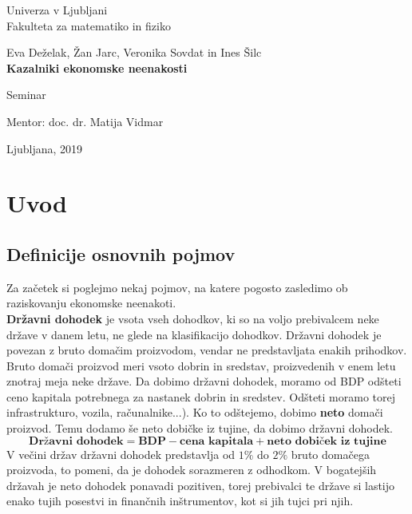 \documentclass[a4paper,12 pt]{article}
\begin{document}
\begin{titlepage}
\begin{center}

\large
Univerza v Ljubljani\\
\normalsize
Fakulteta za matematiko in fiziko\\

\vspace{3 cm} 

\large
Eva Deželak, Žan Jarc, Veronika Sovdat in Ines Šilc\\

\vspace{0.5cm}
\LARGE
\textbf{Kazalniki ekonomske neenakosti}

\vspace{0.5 cm}
\normalsize
Seminar

\vspace{1.5cm}
\normalsize
Mentor: doc. dr. Matija Vidmar

\vspace{3cm}


\vfill

\large Ljubljana, 2019

\end{center}
\end{titlepage}

\newpage

\tableofcontents
\vspace{20mm}

\newpage

\section[Uvod]{Uvod}

\subsection[Definicije osnovnih pojmov]{Definicije osnovnih pojmov}
Za začetek si poglejmo nekaj pojmov, na katere pogosto zasledimo ob raziskovanju ekonomske neenakoti.
\\ 

\textbf{Državni dohodek} je vsota vseh dohodkov, ki so na voljo prebivalcem neke države v danem letu, ne glede na klasifikacijo dohodkov. Državni dohodek je povezan z bruto domačim proizvodom, vendar ne predstavljata enakih prihodkov. Bruto domači proizvod meri vsoto dobrin in sredstav, proizvedenih v enem letu znotraj meja neke države. Da dobimo državni dohodek, moramo od BDP odšteti ceno kapitala potrebnega za nastanek dobrin in sredstev. Odšteti moramo torej infrastrukturo, vozila, računalnike...). Ko to odštejemo, dobimo \textbf{neto} domači proizvod. Temu dodamo še neto dobičke iz tujine, da dobimo državni dohodek.
$$
\textbf{Državni dohodek} = \textbf{BDP} - \textbf{cena kapitala} + \textbf{neto dobiček iz tujine}
$$
V večini držav državni dohodek predstavlja od $1\%$ do $2\%$ bruto domačega proizvoda, to pomeni, da je dohodek sorazmeren z odhodkom. V bogatejših državah je neto dohodek ponavadi pozitiven, torej prebivalci te države si lastijo enako tujih posestvi in finančnih inštrumentov, kot si jih tujci pri njih.
\end{document}
